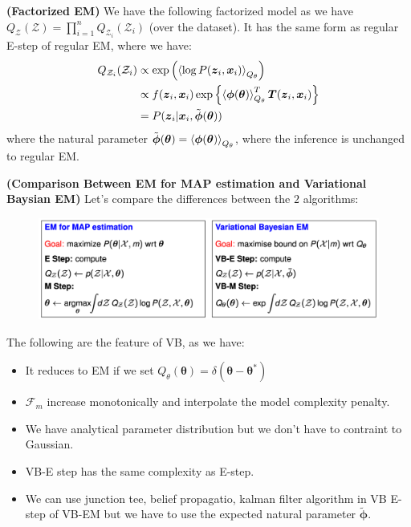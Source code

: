 \begin{remark}{\textbf{(Factorized EM)}}
    We have the following factorized model as we have $Q_\mathcal{Z}(\mathcal{Z}) = \prod^n_{i=1}Q_{\mathcal{Z}_i}(\mathcal{Z}_i)$ (over the dataset). It has the same form as regular E-step of regular EM, where we have:
    \begin{equation*}
    \begin{aligned}
        Q_{\mathcal{Z}_i}(\mathcal{Z}_i) &\propto \exp\left(  \left\langle \log P(\boldsymbol z_i, \boldsymbol x_i) \right\rangle_{Q_\theta}  \right) \\
        &\propto f(\boldsymbol z_i, \boldsymbol x_i)\exp\left\{  \left\langle \boldsymbol \phi(\boldsymbol \theta) \right\rangle^T_{Q_\theta} \boldsymbol T(\boldsymbol z_i,\boldsymbol x_i)  \right\} \\
        &= P(\boldsymbol z_i | \boldsymbol x_i, \tilde{\boldsymbol \phi}(\boldsymbol \theta))
    \end{aligned}
    \end{equation*} 
    where the natural parameter $\tilde{\boldsymbol \phi}(\boldsymbol \theta) = \left\langle \boldsymbol \phi(\boldsymbol \theta) \right\rangle_{Q_\theta}$, where the inference is unchanged to regular EM.
\end{remark}

\begin{remark}{\textbf{(Comparison Between EM for MAP estimation and Variational Baysian EM)}} Let's compare the differences between the $2$ algorithms:
    \begin{figure}[H]
        \centering
        \includegraphics[width=12cm]{img/img13.png}
    \end{figure}  
    The following are the feature of VB, as we have:
    \begin{itemize}
        \item It reduces to EM if we set $Q_\theta(\boldsymbol \theta) = \delta(\boldsymbol \theta-\boldsymbol \theta^*)$
        \item $\mathcal{F}_m$ increase monotonically and interpolate the model complexity penalty. 
        \item We have analytical parameter distribution but we don't have to contraint to Gaussian.
        \item VB-E step has the same complexity as E-step. 
        \item We can use junction tee, belief propagatio, kalman filter algorithm in VB E-step of VB-EM but we have to use the expected natural parameter $\tilde{\boldsymbol \phi}$. 
    \end{itemize}
\end{remark}

